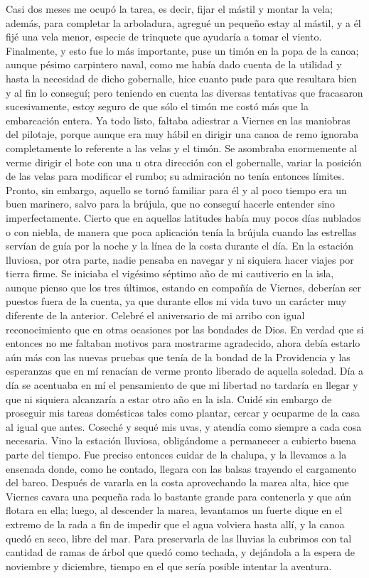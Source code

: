 \documentclass{novela}
\begin{document}
    Casi dos meses me ocupó la tarea, es decir, fijar el mástil y montar la vela; además, para completar la arboladura, agregué un pequeño estay al mástil, y a él fijé una vela menor, especie de trinquete que ayudaría a tomar el viento. Finalmente, y esto fue lo más importante, puse un timón en la popa de la canoa; aunque pésimo carpintero naval, como me había dado cuenta de la utilidad y hasta la necesidad de dicho gobernalle, hice cuanto pude para que resultara bien y al fin lo conseguí; pero teniendo en cuenta las diversas tentativas que fracasaron sucesivamente, estoy seguro de que sólo el timón me costó más que la embarcación entera.
    Ya todo listo, faltaba adiestrar a Viernes en las maniobras del pilotaje, porque aunque era muy hábil en dirigir una canoa de remo ignoraba completamente lo referente a las velas y el timón. Se asombraba enormemente al verme dirigir el bote con una u otra dirección con el gobernalle, variar la posición de las velas para modificar el rumbo; su admiración no tenía entonces límites. Pronto, sin embargo, aquello se tornó familiar para él y al poco tiempo era un buen marinero, salvo para la brújula, que no conseguí hacerle entender sino imperfectamente. Cierto que en aquellas latitudes había muy pocos días nublados o con niebla, de manera que poca aplicación tenía la brújula cuando las estrellas servían de guía por la noche y la línea de la costa durante el día. En la estación lluviosa, por otra parte, nadie pensaba en navegar y ni siquiera hacer viajes por tierra firme.
    Se iniciaba el vigésimo séptimo año de mi cautiverio en la isla, aunque pienso que los tres últimos, estando en compañía de Viernes, deberían ser puestos fuera de la cuenta, ya que durante ellos mi vida tuvo un carácter muy diferente de la anterior. Celebré el aniversario de mi arribo con igual reconocimiento que en otras ocasiones por las bondades de Dios. En verdad que si entonces no me faltaban motivos para mostrarme agradecido, ahora debía estarlo aún más con las nuevas pruebas que tenía de la bondad de la Providencia y las esperanzas que en mí renacían de verme pronto liberado de aquella soledad. Día a día se acentuaba en mí el pensamiento de que mi libertad no tardaría en llegar y que ni siquiera alcanzaría a estar otro año en la isla. Cuidé sin embargo de proseguir mis tareas domésticas tales como plantar, cercar y ocuparme de la casa al igual que antes. Coseché y sequé mis uvas, y atendía como siempre a cada cosa necesaria.
    Vino la estación lluviosa, obligándome a permanecer a cubierto buena parte del tiempo. Fue preciso entonces cuidar de la chalupa, y la llevamos a la ensenada donde, como he contado, llegara con las balsas trayendo el cargamento del barco. Después de vararla en la costa aprovechando la marea alta, hice que Viernes cavara una pequeña rada lo bastante grande para contenerla y que aún flotara en ella; luego, al descender la marea, levantamos un fuerte dique en el extremo de la rada a fin de impedir que el agua volviera hasta allí, y la canoa quedó en seco, libre del mar. Para preservarla de las lluvias la cubrimos con tal cantidad de ramas de árbol que quedó como techada, y dejándola a la espera de noviembre y diciembre, tiempo en el que sería posible intentar la aventura.
\end{document}
